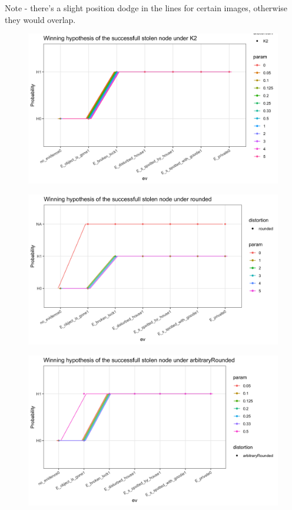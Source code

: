\documentclass[11pt]{amsart}
\begin{document}
Note - there's a slight position dodge in the lines for certain images, otherwise they would overlap.
\begin{figure}[htbp]
\begin{center}
\includegraphics[scale=0.17]{images/K2Weak.png}
\label{default}
\end{center}
\end{figure}
\begin{figure}[htbp]
\begin{center}
\includegraphics[scale=0.17]{images/roundedWeak.png}
\label{default}
\end{center}
\end{figure}
\begin{figure}[htbp]
\begin{center}
\includegraphics[scale=0.17]{images/arbitraryRoundedWeak.png}
\label{default}
\end{center}
\end{figure}
\end{document}
